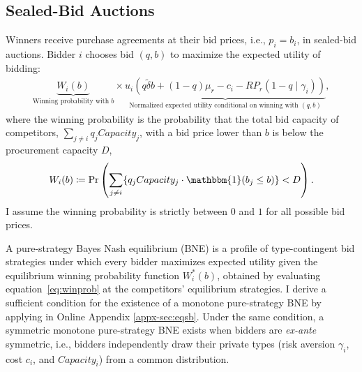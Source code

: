 \documentclass[12pt]{article}
\theoremstyle{definition} %
\newcommand{\I}{\mathbbm{1}}
\begin{document}
\subsection{Sealed-Bid Auctions}
\label{sec:sb}

Winners receive purchase agreements at their bid prices, i.e., $p_i = b_i$, in sealed-bid auctions. Bidder $i$ chooses bid $(q,b)$ to maximize the expected utility of bidding:
\begin{align*}
\underbrace{W_i(b)}_{\text{Winning probability with $b$}} \times 
\underbrace{u_i\!\left(q \tilde{\delta} b + (1 - q) \mu_r - c_i - RP_r(1-q \mid \gamma_i) \right)}_{\text{Normalized expected utility conditional on winning with $(q,b)$}},
\end{align*}
where the winning probability is the probability that the total bid capacity of competitors, $\sum_{j \neq i} q_j Capacity_j$, with a bid price lower than $b$ is below the procurement capacity $D$,
\begin{align}
\label{eq:winprob}
W_i(b) \coloneqq \Pr \left(\sum_{j \neq i} \{ q_j Capacity_j \cdot \I(b_j \leq b) \} < D \right).
\end{align}
I assume the winning probability is strictly between $0$ and $1$ for all possible bid prices.

A pure-strategy Bayes Nash equilibrium (BNE) is a profile of type-contingent bid strategies under which every bidder maximizes expected utility given the equilibrium winning probability function $W_i^\ast(b)$, obtained by evaluating equation~\eqref{eq:winprob} at the competitors' equilibrium strategies. I derive a sufficient condition for the existence of a monotone pure-strategy BNE by applying \citet{Reny2011} in Online Appendix \ref{appx-sec:eqsb}. Under the same condition, a symmetric monotone pure-strategy BNE exists when bidders are \textit{ex-ante} symmetric, i.e., bidders independently draw their private types (risk aversion $\gamma_i$, cost $c_i$, and $Capacity_i$) from a common distribution.
\end{document}
